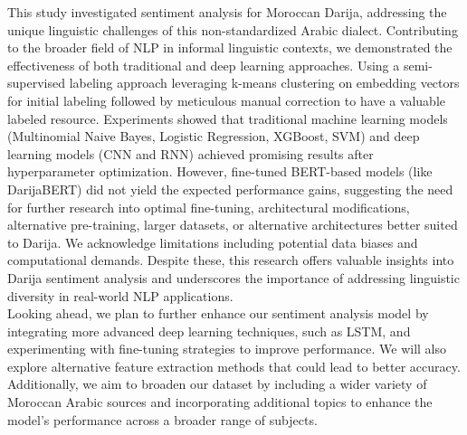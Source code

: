 \documentclass[a4paper,40pt,twocolumn]{article}
\begin{document}
This study investigated sentiment analysis for Moroccan Darija, addressing the unique linguistic challenges of this non-standardized Arabic dialect. Contributing to the broader field of NLP in informal linguistic contexts, we demonstrated the effectiveness of both traditional and deep learning approaches. Using a semi-supervised labeling approach leveraging k-means clustering on embedding vectors for initial labeling followed by meticulous manual correction to have a valuable labeled resource. Experiments showed that traditional machine learning models (Multinomial Naive Bayes, Logistic Regression, XGBoost, SVM) and deep learning models (CNN and RNN) achieved promising results after hyperparameter optimization. However, fine-tuned BERT-based models (like DarijaBERT) did not yield the expected performance gains, suggesting the need for further research into optimal fine-tuning, architectural modifications, alternative pre-training, larger datasets, or alternative architectures better suited to Darija. We acknowledge limitations including potential data biases and computational demands. Despite these, this research offers valuable insights into Darija sentiment analysis and underscores the importance of addressing linguistic diversity in real-world NLP applications. \\
Looking ahead, we plan to further enhance our sentiment analysis model by integrating more advanced deep learning techniques, such as LSTM, and experimenting with fine-tuning strategies to improve performance. We will also explore alternative feature extraction methods that could lead to better accuracy. Additionally, we aim to broaden our dataset by including a wider variety of Moroccan Arabic sources and incorporating additional topics to enhance the model's performance across a broader range of subjects.


\printbibliography
\end{document}
